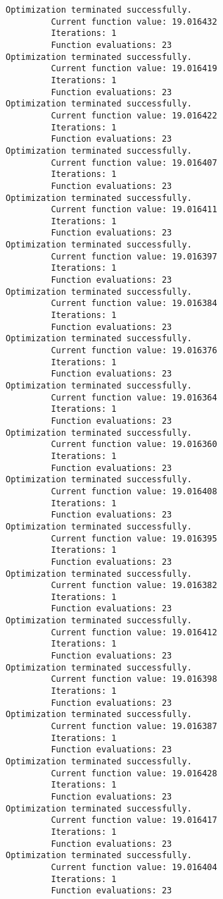 \documentclass[11pt]{article}
\begin{document}
\begin{Verbatim}[commandchars=\\\{\}]
Optimization terminated successfully.
         Current function value: 19.016432
         Iterations: 1
         Function evaluations: 23
Optimization terminated successfully.
         Current function value: 19.016419
         Iterations: 1
         Function evaluations: 23
Optimization terminated successfully.
         Current function value: 19.016422
         Iterations: 1
         Function evaluations: 23
Optimization terminated successfully.
         Current function value: 19.016407
         Iterations: 1
         Function evaluations: 23
Optimization terminated successfully.
         Current function value: 19.016411
         Iterations: 1
         Function evaluations: 23
Optimization terminated successfully.
         Current function value: 19.016397
         Iterations: 1
         Function evaluations: 23
Optimization terminated successfully.
         Current function value: 19.016384
         Iterations: 1
         Function evaluations: 23
Optimization terminated successfully.
         Current function value: 19.016376
         Iterations: 1
         Function evaluations: 23
Optimization terminated successfully.
         Current function value: 19.016364
         Iterations: 1
         Function evaluations: 23
Optimization terminated successfully.
         Current function value: 19.016360
         Iterations: 1
         Function evaluations: 23
Optimization terminated successfully.
         Current function value: 19.016408
         Iterations: 1
         Function evaluations: 23
Optimization terminated successfully.
         Current function value: 19.016395
         Iterations: 1
         Function evaluations: 23
Optimization terminated successfully.
         Current function value: 19.016382
         Iterations: 1
         Function evaluations: 23
Optimization terminated successfully.
         Current function value: 19.016412
         Iterations: 1
         Function evaluations: 23
Optimization terminated successfully.
         Current function value: 19.016398
         Iterations: 1
         Function evaluations: 23
Optimization terminated successfully.
         Current function value: 19.016387
         Iterations: 1
         Function evaluations: 23
Optimization terminated successfully.
         Current function value: 19.016428
         Iterations: 1
         Function evaluations: 23
Optimization terminated successfully.
         Current function value: 19.016417
         Iterations: 1
         Function evaluations: 23
Optimization terminated successfully.
         Current function value: 19.016404
         Iterations: 1
         Function evaluations: 23

\end{Verbatim}
\end{document}
